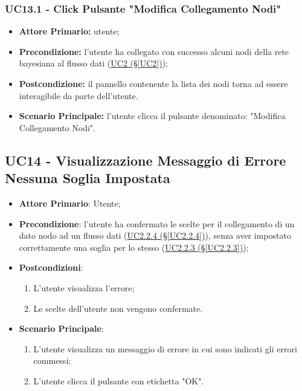 \subsubsection{UC13.1 - Click Pulsante "Modifica Collegamento Nodi"}\label{UC13.1}
\begin{itemize}
\item \textbf{Attore Primario:} utente;
\item \textbf{Precondizione:} l'utente ha collegato con successo alcuni nodi della rete bayesiana al flusso dati 			(\hyperref[UC2]{UC2 (§\ref*{UC2})});
\item \textbf{Postcondizione:} il pannello contenente la lista dei nodi torna ad essere interagibile da parte dell'utente.
\item \textbf{Scenario Principale:} l'utente clicca il pulsante denominato: "Modifica Collegamento Nodi".
\end{itemize}
\newpage

\subsection{UC14 - Visualizzazione Messaggio di Errore Nessuna Soglia Impostata}\label{UC14}
\begin{itemize}
\item \textbf{Attore Primario}: Utente;
\item \textbf{Precondizione}: l'utente ha confermato le scelte per il collegamento di un dato nodo ad un flusso 				dati (\hyperref[UC2.2.4]{UC2.2.4 (§\ref*{UC2.2.4})}), senza aver impostato correttamente una soglia per lo stesso 	(\hyperref[UC2.2.3]{UC2.2.3 (§\ref*{UC2.2.3})});
\item \textbf{Postcondizioni}: 
	\begin{enumerate}
	\item L'utente visualizza l'errore;
	\item Le scelte dell'utente non vengono confermate.
	\end{enumerate}
\item \textbf{Scenario Principale}: 
	\begin{enumerate}
	\item L'utente visualizza un messaggio di errore in cui sono indicati gli errori commessi;
	\item L'utente clicca il pulsante con etichetta "OK".
	\end{enumerate}
\end{itemize}

\pagebreak

